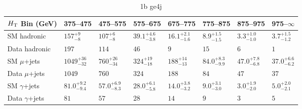 \documentclass[8pt]{article}
\def\scalht{\mbox{$H_{\rm{T}}$}\xspace}
\newcommand\T{\rule{0pt}{2.6ex}}
\newcommand\B{\rule[-1.2ex]{0pt}{0pt}}
\begin{document}
\begin{table}[ht!]
\caption{1b ge4j}
\label{tab:ensemble-1b ge4j}
\centering
\begin{tabular}{ llllllll }

\hline
\scalht Bin (GeV)       & 375--475                       & 475--575                       & 575--675                       & 675--775                       & 775--875                       & 875--975                       & 975--$\infty$                  \\ [1.000000ex]
\hline
SM hadronic\T           & $157^{+9}_{-8}$                & $107^{+6}_{-8}$                & $39.1^{+4.6}_{-3.8}$           & $16.1^{+2.1}_{-1.6}$           & $8.9^{+1.5}_{-1.5}$            & $3.3^{+1.0}_{-1.0}$            & $3.7^{+1.5}_{-1.2}$            \\ 
Data hadronic\B         & $197$                          & $114$                          & $46$                           & $9$                            & $15$                           & $6$                            & $1$                            \\ 
\hline
SM $\mu$+jets\T         & $1049^{+36}_{-32}$             & $760^{+26}_{-34}$              & $324^{+19}_{-18}$              & $188^{+14}_{-13}$              & $84.0^{+8.3}_{-9.9}$           & $47.0^{+7.8}_{-6.8}$           & $37.0^{+6.6}_{-6.2}$           \\ 
Data $\mu$+jets\B       & $1049$                         & $760$                          & $324$                          & $188$                          & $84$                           & $47$                           & $37$                           \\ 
\hline
SM $\gamma$+jets\T      & $81.0^{+9.2}_{-9.4}$           & $57.0^{+6.9}_{-8.3}$           & $28.0^{+6.1}_{-5.8}$           & $14.0^{+3.8}_{-3.2}$           & $9.0^{+3.1}_{-3.0}$            & $3.0^{+1.9}_{-2.0}$            & $5.0^{+2.0}_{-2.1}$            \\ 
Data $\gamma$+jets\B    & $81$                           & $57$                           & $28$                           & $14$                           & $9$                            & $3$                            & $5$                            \\ 
\hline

\end{tabular}
\end{table}
\end{document}
